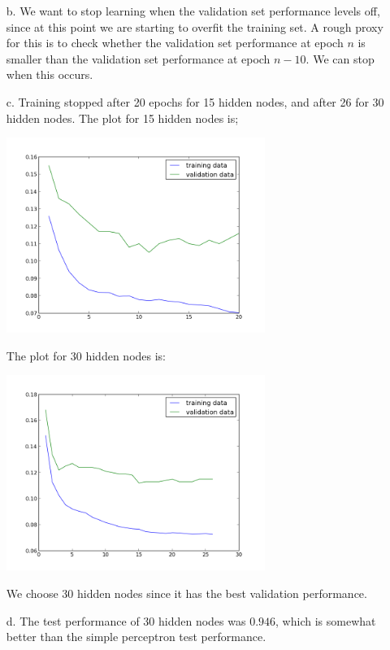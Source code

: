 \documentclass[12pt]{amsart}
\theoremstyle{remark}
\begin{document}
\begin{itemize}
\begin{itemize}





\item[b.] We want to stop learning when the validation set performance levels off, since at this point we are starting to overfit the training set.
A rough proxy for this is to check whether the validation set performance at epoch $n$ is smaller  than the validation set performance at epoch $n-10$.
We can stop when this occurs.

\item[c.]
Training stopped after 20 epochs for 15 hidden nodes, and after 26 for 30 hidden nodes.
The plot for 15 hidden nodes is;

\includegraphics[height=2.5in]{hidden15_perf}

The plot for 30 hidden nodes is:

\includegraphics[height=2.5in]{hidden30_perf}

We choose 30 hidden nodes since it has the best validation performance.

\item[d.] The test performance of 30 hidden nodes was $0.946$, which is somewhat better than the simple perceptron test performance.


\end{itemize}
\end{itemize}
\end{document}
